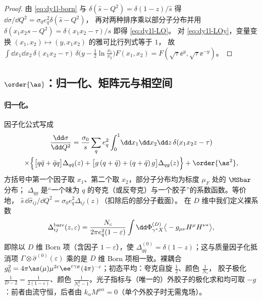 \begin{proof}
由 \cref{eq:dy1l-born} 与 $\delta(\hat s-Q^2)=\delta(1-z)/\hat s$ 得 $\dd\hat\sigma/\dd Q^2=\sigma_0e_q^2\delta(\hat s-Q^2)$，
再对两种排序乘以部分子分布并用 $\delta(x_1x_2s-Q^2)=\delta(x_1x_2-\tau)/s$ 即得 \cref{eq:dy1l-LO}。
对 \cref{eq:dy1l-LOy}，变量变换 $(x_1,x_2)\mapsto(y,x_1x_2)$ 的雅可比行列式等于 $1$，
故 $\int\dd x_1\dd x_2\,\delta(x_1x_2-\tau)\,\delta\big(y-\frac12\ln\frac{x_1}{x_2}\big)F(x_1,x_2)=F(\sqrt\tau\ee^{y},\sqrt\tau\ee^{-y})$。
\end{proof}

\subsection{\texorpdfstring{$\order{\as}$}{O(αs)}：归一化、矩阵元与相空间}
\label{sec:dy1l-me}

\paragraph{归一化。}因子化公式写成
\begin{multline}\label{eq:dy1l-fact}
\frac{\dd\sigma}{\dd Q^2}=\frac{\sigma_0}{s}\sum_qe_q^2\int_0^1\!\dd x_1\dd x_2\dd z\,\delta(x_1x_2z-\tau)\\
\times\Big\{\big[q\bar q+\bar qq\big]\Delta_{q\bar q}(z)+\big[g\,(q+\bar q)+(q+\bar q)\,g\big]\Delta_{qg}(z)\Big\}+\order{\as^2},
\end{multline}
方括号中第一个因子取 $x_1$、第二个取 $x_2$，部分子分布均为标度 $\mu_F$ 处的 $\MSbar$ 分布；
$\Delta_{qg}$ 是“一个味为 $q$ 的夸克（或反夸克）与一个胶子”的系数函数。等价地，
$\hat s\,\dd\hat\sigma_{ij}/\dd Q^2=\sigma_0e_q^2\Delta_{ij}(z)$（扣除后的部分子截面）。
在 $D$ 维中我们定义裸系数
\begin{equation}\label{eq:dy1l-bare}
\Delta^{\rm bare}_{ij}(z,\varepsilon)=\frac{N_c}{2\pi e_q^2(1-\varepsilon)}\int\dd\Phi^{(D)}_{\gamma^*X}\big\langle-g_{\mu\nu}H^\mu H^{\nu*}\big\rangle ,
\end{equation}
即除以 $D$ 维 Born 项（含因子 $1-\varepsilon$），使 $\Delta^{(0)}_{q\bar q}=\delta(1-z)$；这与质量因子化抵消项
$\Gamma\otimes\hat\sigma^{(0)}(\varepsilon)$ 乘的是 $D$ 维 Born 项相一致。裸耦合
$g_0^2=4\pi\as(\mu)\mu^{2\varepsilon}\ee^{\varepsilon\gamma_E}(4\pi)^{-\varepsilon}$；初态平均：夸克自旋 $\frac12$、颜色 $\frac1{N_c}$，
胶子极化 $\frac{1}{D-2}=\frac{1}{2(1-\varepsilon)}$、颜色 $\frac{1}{N_c^2-1}$。光子指标与（唯一的）外胶子的极化求和均可取
$-g$：前者由流守恒，后者由 $k_\alpha M^{\mu\alpha}=0$（单个外胶子时无需鬼场）。

